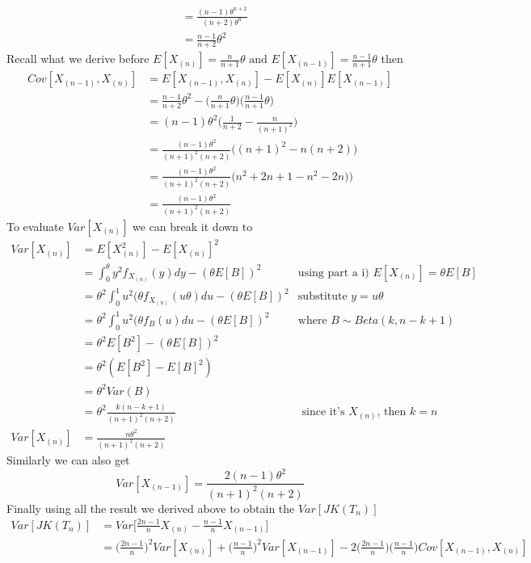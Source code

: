 \documentclass[a4paper,11pt]{article}
\begin{document}
\begin{enumerate}[a)]
\begin{enumerate}[i)]
\begin{align*}
		&= \frac{(n-1)\theta^{n+2}}{(n+2) \theta^n}  \\
		&= \frac{n-1}{n+2}\theta^{2}
	\end{align*}
	Recall what we derive before $E[X_{(n)}] =  \frac{n}{n+1}\theta \mbox{ and } E[X_{(n-1)}] =  \frac{n-1}{n+1}\theta$ then
	\begin{align*}	
		Cov[X_{(n-1)},X_{(n)}] &= E[X_{(n-1)},X_{(n)}] -E[X_{(n)}]E[X_{(n-1)}]\\
		&=  \frac{n-1}{n+2}\theta^{2} -  \bigg(\frac{n}{n+1}\theta\bigg) \bigg(\frac{n-1}{n+1}\theta \bigg)\\
		&= (n-1)\theta^2 \bigg( \frac{1}{n+2} - \frac{n}{(n+1)^2} \bigg)\\
		&= \frac{(n-1)\theta^2}{(n+1)^2(n+2)}\bigg( (n+1)^2 - n(n+2)\bigg)\\
		&= \frac{(n-1)\theta^2}{(n+1)^2(n+2)}\bigg( n^2 +2n +1 - n^2-2n)\bigg)\\
		&=\frac{(n-1)\theta^2}{(n+1)^2(n+2)}
	\end{align*}
	To evaluate $Var[X_{(n)}] $ we can break it down to
	\begin{align*}
		Var[X_{(n)}] &=E[X_{(n)}^2]-E[X_{(n)}]^2 \\
		&= \int^\theta_0 y^2f_{X_{(n)}}(y)dy - (\theta E[B])^2 & \mbox{using part a i) $E[X_{(n)}] = \theta E[B]$ }\\
		&= \theta^2 \int^1_0 u^2 (\theta f_{X_{(n)}}(u\theta)du - (\theta E[B])^2 & \mbox{substitute $y=u\theta$}\\
		&= \theta^2 \int^1_0 u^2 (\theta f_{B}(u)du - (\theta E[B])^2  & \mbox{where $B\sim Beta (k,n-k+1)$}\\
		&= \theta^2  E[B^2]- (\theta E[B])^2\\
		& = \theta^2 (E[B^2]- E[B]^2)\\
		&= \theta^2 Var(B)\\
		&=\theta^2 \frac{k(n-k+1)}{(n+1)^2(n+2)} & \mbox{ since it's $X_{(n)}$, then $k=n$}\\
		Var[X_{(n)}] &= \frac{n\theta^2 }{(n+1)^2(n+2)}
	\end{align*}
	Similarly we can also get
	\[
	Var[X_{(n-1)}]=  \frac{2(n-1)\theta^2 }{(n+1)^2(n+2)}
	\]
	Finally using all the result we derived above to obtain the $Var[JK(T_n)]$
	\begin{align*}
	Var[JK(T_n)]  &=  Var\bigg[\frac{2n-1}{n}X_{(n)} - \frac{n-1}{n}X_{(n-1)}\bigg]\\
	&= \bigg(\frac{2n-1}{n}  \bigg)^2 Var[X_{(n)}] +\bigg(\frac{n-1}{n}\bigg)^2Var[X_{(n-1)}] -2\bigg(\frac{2n-1}{n}  \bigg)\bigg(\frac{n-1}{n}\bigg) Cov[X_{(n-1)},X_{(n)}]\\

\end{align*}
\end{enumerate}
\end{enumerate}
\end{document}
